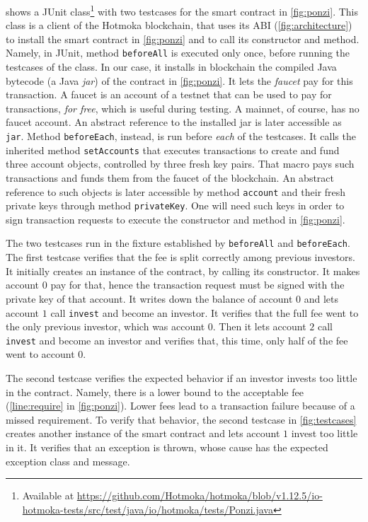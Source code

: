  shows a JUnit class\footnote{Available at \url{https://github.com/Hotmoka/hotmoka/blob/v1.12.5/io-hotmoka-tests/src/test/java/io/hotmoka/tests/Ponzi.java}} with two testcases for the smart contract
in \cref{fig:ponzi}. This class is a client of the Hotmoka blockchain, that uses its
ABI (\cref{fig:architecture})
to install the smart contract in \cref{fig:ponzi} and to call its constructor and method.
Namely, in JUnit, method \texttt{beforeAll} is executed only once, before running the
testcases of the class. In our case, it installs in blockchain the compiled Java bytecode
(a Java \emph{jar}) of the contract in \cref{fig:ponzi}. It lets the \emph{faucet}
pay for this transaction. A faucet is an account of a testnet that can be used to
pay for transactions, \emph{for free}, which is useful during testing.
A mainnet, of course, has no faucet account. An abstract reference to the installed
jar is later accessible as \texttt{jar}. Method \texttt{beforeEach}, instead, is
run before \emph{each} of the testcases. It calls the inherited method \texttt{setAccounts}
that executes transactions to create and fund three account objects, controlled by three fresh key pairs.
That macro pays such transactions and funds them
from the faucet of the blockchain.
An abstract reference to such objects is later accessible by method \texttt{account} and their fresh
private keys through method \texttt{privateKey}. One will need such keys in order to sign transaction
requests to execute the constructor and method in \cref{fig:ponzi}.

The two testcases run in the fixture established by \texttt{beforeAll} and \texttt{beforeEach}.
The first testcase verifies that the fee is split correctly among previous investors.
It initially creates an instance of the contract, by calling its constructor. It makes account $0$
pay for that, hence the transaction request must be signed with the private key of that account.
It writes down the balance of account $0$ and lets account $1$ call \texttt{invest} and become
an investor. It verifies that the full fee went to the only previous investor,
which was account $0$. Then it lets account $2$ call \texttt{invest} and become an investor and
verifies that, this time, only half of the fee went to account $0$.

The second testcase verifies the expected behavior if an investor invests too little
in the contract. Namely, there is a lower bound to the acceptable fee
(\cref{line:require} in \cref{fig:ponzi}). Lower fees lead to a transaction failure because
of a missed requirement. To verify that behavior, the second testcase in \cref{fig:testcases}
creates another instance
of the smart contract and lets account $1$ invest too little in it. It verifies that
an exception is thrown, whose cause has the expected exception class and message.

